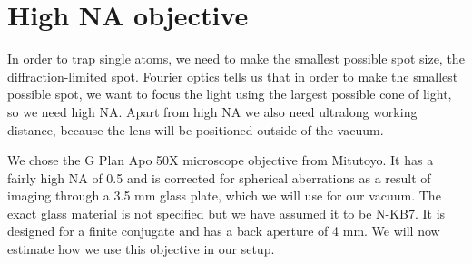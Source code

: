 


\section{High NA objective}

In order to trap single atoms, we need to make the smallest possible spot size, the diffraction-limited spot. Fourier optics tells us that in order to make the smallest possible spot, we want to focus the light using the largest possible cone of light, so we need high NA. Apart from high NA we also need ultralong working distance, because the lens will be positioned outside of the vacuum. 

We chose the G Plan Apo 50X microscope objective from Mitutoyo. It has a fairly high NA of 0.5 and is corrected for spherical aberrations as a result of imaging through a 3.5 mm glass plate, which we will use for our vacuum. The exact glass material is not specified but we have assumed it to be N-KB7. It is designed for a finite conjugate and has a back aperture of 4 mm. We will now estimate how we use this objective in our setup. 

